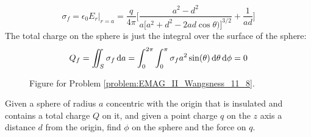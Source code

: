 \begin{solution}
\begin{equation}
                        \sigma_{f}=\epsilon_{0}E_{r}\Big|_{r=a}
                        =\frac{q}{4\pi}\Big[
                            \frac{a^{2}-d^{2}}
                                {a[a^{2}+d^{2}-2ad\cos{\theta)]^{3/2}}}
                                +\frac{1}{ad}\Big]
                    \end{equation}
                    The total charge on the sphere is just the integral
                    over the surface of the sphere:
                    \begin{equation}
                        Q_{f}=\iint_{S}\sigma_{f}\mathop{}\!\mathrm{d}{a}
                        =\int_{0}^{2\pi}\int_{0}^{\pi}
                            \sigma_{f}a^{2}\sin(\theta)
                            \mathop{}\!\mathrm{d}{\theta}\mathop{}\!\mathrm{d}{\phi}=0
                    \end{equation}
                \end{solution}
                \begin{figure}[H]
                    \centering
                    \captionsetup{type=figure}
                    
                    \caption{Figure for Problem
                             \ref{problem:EMAG_II_Wangsness_11_8}.}
                    \label{fig:EMAG_II_Wangsness_11_8}
                \end{figure}
                \begin{problem}
                    Given a sphere of radius $a$ concentric with the
                    origin that is insulated and contains a total charge
                    $Q$ on it, and given a point charge $q$ on the
                    $z$ axis a distance $d$ from the origin, find
                    $\phi$ on the sphere and the force on $q$.
                \end{problem}
